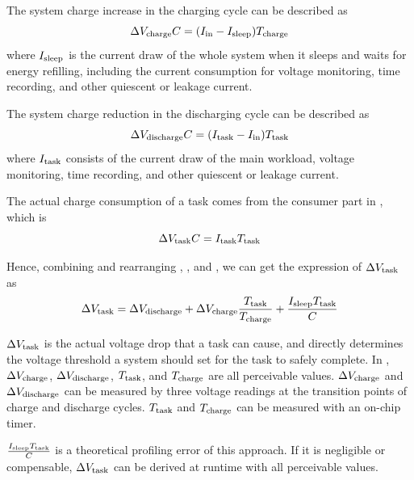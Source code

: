 The system charge increase in the charging cycle can be described as
\begin{equation}
    \Delta V_{\text{charge}} C = (I_{\text{in}} - I_{\text{sleep}}) T_{\text{charge}}
    \label{eq:vcharge} 
\end{equation}
where $I_{\text{sleep}}$ is the current draw of the whole system when it sleeps and waits for energy refilling, including the current consumption for voltage monitoring, time recording, and other quiescent or leakage current.  

The system charge reduction in the discharging cycle can be described as
\begin{equation}
    \Delta V_{\text{discharge}} C = (I_{\text{task}} - I_{\text{in}}) T_{\text{task}}
    \label{eq:vdischarge} 
\end{equation}
where $I_{\text{task}}$ consists of the current draw of the main workload, voltage monitoring, time recording, and other quiescent or leakage current. 

The actual charge consumption of a task comes from the consumer part in , which is
\begin{equation}
    \Delta V_{\text{task}} C = I_{\text{task}} T_{\text{task}}
    \label{eq:vtaskc} 
\end{equation}

Hence, combining and rearranging , , and , we can get the expression of $\Delta V_{\text{task}}$ as
\begin{equation}
    \Delta V_{\text{task}} = \Delta V_{\text{discharge}} + \Delta V_{\text{charge}} \frac{T_{\text{task}}}{T_{\text{charge}}} + \frac{I_{\text{sleep}}T_{\text{task}}}{C}
    \label{eq:vtask} 
\end{equation}

$\Delta V_{\text{task}}$ is the actual voltage drop that a task can cause, and directly determines the voltage threshold a system should set for the task to safely complete.
In , $\Delta V_{\text{charge}}$, $\Delta V_{\text{discharge}}$, $T_{\text{task}}$, and $T_{\text{charge}}$ are all perceivable values.
$\Delta V_{\text{charge}}$ and $\Delta V_{\text{discharge}}$ can be measured by three voltage readings at the transition points of charge and discharge cycles.  
$T_{\text{task}}$ and $T_{\text{charge}}$ can be measured with an on-chip timer. 

$\frac{I_{\text{sleep}}T_{\text{task}}}{C}$ is a theoretical profiling error of this approach.
If it is negligible or compensable, $\Delta V_{\text{task}}$ can be derived at runtime with all perceivable values. 

